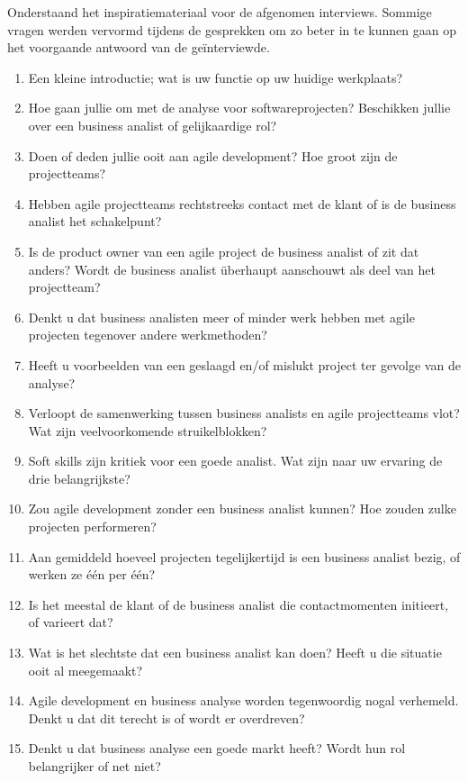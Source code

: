 \documentclass{hogent-article}
\begin{document}
Onderstaand het inspiratiemateriaal voor de afgenomen interviews. Sommige vragen werden vervormd
tijdens de gesprekken om zo beter in te kunnen gaan op het voorgaande antwoord van de geïnterviewde.

\vspace{5pt}

\begin{enumerate}[label=\bfseries\Alph* |]
  \item Een kleine introductie; wat is uw functie op uw huidige werkplaats?
  \item Hoe gaan jullie om met de analyse voor softwareprojecten? Beschikken jullie over een business analist of gelijkaardige rol?
  \item Doen of deden jullie ooit aan agile development? Hoe groot zijn de projectteams? 
  \item Hebben agile projectteams rechtstreeks contact met de klant of is de business analist het schakelpunt?
  \item Is de product owner van een agile project de business analist of zit dat anders? Wordt de business analist überhaupt aanschouwt als deel van het projectteam?
  \item Denkt u dat business analisten meer of minder werk hebben met agile projecten tegenover andere werkmethoden?
  \item Heeft u voorbeelden van een geslaagd en/of mislukt project ter gevolge van de analyse?
  \item Verloopt de samenwerking tussen business analists en agile projectteams vlot? Wat zijn veelvoorkomende struikelblokken?
  \item Soft skills zijn kritiek voor een goede analist. Wat zijn naar uw ervaring de drie belangrijkste?
  \item Zou agile development zonder een business analist kunnen? Hoe zouden zulke projecten performeren?
  \item Aan gemiddeld hoeveel projecten tegelijkertijd is een business analist bezig, of werken ze één per één?
  \item Is het meestal de klant of de business analist die contactmomenten initieert, of varieert dat?
  \item Wat is het slechtste dat een business analist kan doen? Heeft u die situatie ooit al meegemaakt?
  \item Agile development en business analyse worden tegenwoordig nogal verhemeld. Denkt u dat dit terecht is of wordt er overdreven?
  \item Denkt u dat business analyse een goede markt heeft? Wordt hun rol belangrijker of net niet?
\end{enumerate}
 
\end{document}
